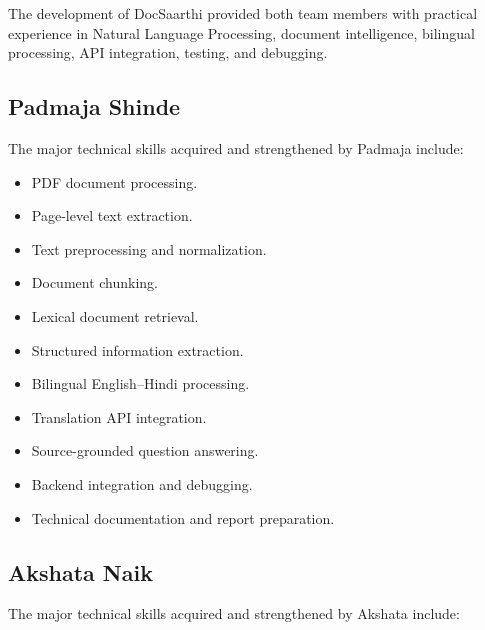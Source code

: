 The development of DocSaarthi provided both team members with
practical experience in Natural Language Processing, document
intelligence, bilingual processing, API integration, testing, and
debugging.

\subsection{Padmaja Shinde}

The major technical skills acquired and strengthened by Padmaja
include:

\begin{itemize}

    \item PDF document processing.

    \item Page-level text extraction.

    \item Text preprocessing and normalization.

    \item Document chunking.

    \item Lexical document retrieval.

    \item Structured information extraction.

    \item Bilingual English--Hindi processing.

    \item Translation API integration.

    \item Source-grounded question answering.

    \item Backend integration and debugging.

    \item Technical documentation and report preparation.

\end{itemize}

\subsection{Akshata Naik}

The major technical skills acquired and strengthened by Akshata
include:


